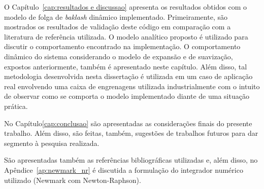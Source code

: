 O Capítulo~\ref{cap:resultados e discussao} apresenta os resultados obtidos com o modelo de folga de \textit{baklash} dinâmico implementado. Primeiramente, são mostrados os resultados de validação deste código em comparação com a literatura de referência utilizada. O modelo analítico proposto é utilizado para discutir o comportamento encontrado na implementação. O comportamento dinâmico do sistema considerando o modelo de expansão e de suavização, expostos anteriormente, também é apresentado neste capítulo. Além disso, tal metodologia desenvolvida nesta dissertação é utilizada em um caso de aplicação real envolvendo uma caixa de engrenagens utilizada industrialmente com o intuito de observar como se comporta o modelo implementado diante de uma situação prática.

No Capítulo\ref{cap:conclusao} são apresentadas as considerações finais do presente trabalho. Além disso, são feitas, também, sugestões de trabalhos futuros para dar segmento à pesquisa realizada.

São apresentadas também as referências bibliográficas utilizadas e, além disso, no Apêndice~\ref{ap:newmark_nr} é discutida a formulação do integrador numérico utilizado (Newmark com Newton-Raphson).
